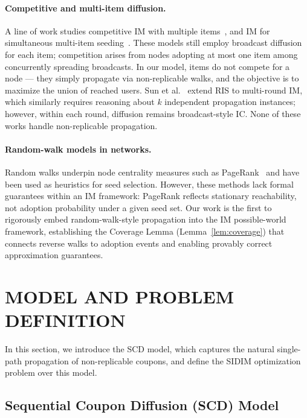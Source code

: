 \documentclass[sigconf]{acmart}
\begin{document}
\paragraph{Competitive and multi-item diffusion.}
A line of work studies competitive IM with multiple
items~\cite{budak2011limiting,chen2011influence,lu2015competition}, and
IM for simultaneous multi-item
seeding~\cite{bharathi2007competitive,goyal2012competitive}.
These models still employ broadcast diffusion for each item; competition
arises from nodes adopting at most one item among concurrently spreading
broadcasts.
In our model, items do not compete for a node — they simply propagate
via non-replicable walks, and the objective is to maximize the union of
reached users.
Sun et al.~\cite{sun2018multi} extend RIS to multi-round IM, which
similarly requires reasoning about $k$ independent propagation
instances; however, within each round, diffusion remains broadcast-style
IC.
None of these works handle non-replicable propagation.

\paragraph{Random-walk models in networks.}
Random walks underpin node centrality measures such as
PageRank~\cite{page1999pagerank} and have been used as heuristics for
seed selection.
However, these methods lack formal guarantees within an IM framework:
PageRank reflects stationary reachability, not adoption probability
under a given seed set.
Our work is the first to rigorously embed random-walk-style propagation
into the IM possible-world framework, establishing the Coverage
Lemma (Lemma~\ref{lem:coverage}) that connects reverse walks to
adoption events and enabling provably correct approximation guarantees.

\section{MODEL AND PROBLEM DEFINITION}
\label{sec:model}

In this section, we introduce the SCD model, which captures
the natural single-path propagation of non-replicable coupons, and
define the SIDIM optimization problem over this model.

\subsection{Sequential Coupon Diffusion (SCD) Model}
\end{document}
